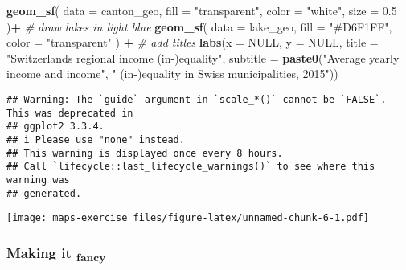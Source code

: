 \documentclass[
]{article}
\newenvironment{Shaded}{\begin{snugshade}}{\end{snugshade}}
\newcommand{\AttributeTok}[1]{\textcolor[rgb]{0.13,0.29,0.53}{#1}}
\newcommand{\CommentTok}[1]{\textcolor[rgb]{0.56,0.35,0.01}{\textit{#1}}}
\newcommand{\ConstantTok}[1]{\textcolor[rgb]{0.56,0.35,0.01}{#1}}
\newcommand{\FloatTok}[1]{\textcolor[rgb]{0.00,0.00,0.81}{#1}}
\newcommand{\FunctionTok}[1]{\textcolor[rgb]{0.13,0.29,0.53}{\textbf{#1}}}
\newcommand{\NormalTok}[1]{#1}
\newcommand{\SpecialCharTok}[1]{\textcolor[rgb]{0.81,0.36,0.00}{\textbf{#1}}}
\newcommand{\StringTok}[1]{\textcolor[rgb]{0.31,0.60,0.02}{#1}}
\begin{document}
\begin{Shaded}
\begin{Highlighting}[]
  \FunctionTok{geom\_sf}\NormalTok{(}
    \AttributeTok{data =}\NormalTok{ canton\_geo,}
    \AttributeTok{fill =} \StringTok{"transparent"}\NormalTok{,}
    \AttributeTok{color =} \StringTok{"white"}\NormalTok{,}
    \AttributeTok{size =} \FloatTok{0.5}
\NormalTok{  )}\SpecialCharTok{+}
  \CommentTok{\# draw lakes in light blue}
  \FunctionTok{geom\_sf}\NormalTok{(}
    \AttributeTok{data =}\NormalTok{ lake\_geo,}
    \AttributeTok{fill =} \StringTok{"\#D6F1FF"}\NormalTok{,}
    \AttributeTok{color =} \StringTok{"transparent"}
\NormalTok{  ) }\SpecialCharTok{+}
  \CommentTok{\# add titles}
  \FunctionTok{labs}\NormalTok{(}\AttributeTok{x =} \ConstantTok{NULL}\NormalTok{,}
         \AttributeTok{y =} \ConstantTok{NULL}\NormalTok{,}
         \AttributeTok{title =} \StringTok{"Switzerland\textquotesingle{}s regional income (in{-})equality"}\NormalTok{,}
         \AttributeTok{subtitle =} \FunctionTok{paste0}\NormalTok{(}\StringTok{"Average yearly income and income"}\NormalTok{,}
                           \StringTok{" (in{-})equality in Swiss municipalities, 2015"}\NormalTok{))}
\end{Highlighting}
\end{Shaded}

\begin{verbatim}
## Warning: The `guide` argument in `scale_*()` cannot be `FALSE`. This was deprecated in
## ggplot2 3.3.4.
## i Please use "none" instead.
## This warning is displayed once every 8 hours.
## Call `lifecycle::last_lifecycle_warnings()` to see where this warning was
## generated.
\end{verbatim}

\texttt{[image: maps-exercise\_files/figure-latex/unnamed-chunk-6-1.pdf]}

\hypertarget{making-it-fancy}{%
\subsubsection{\texorpdfstring{Making it
\textsubscript{fancy}}{Making it fancy}}\label{making-it-fancy}}
\end{document}
